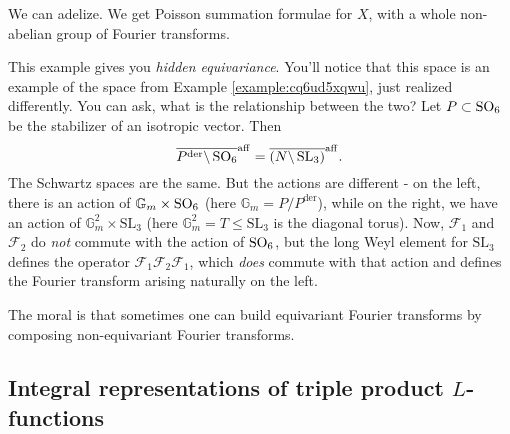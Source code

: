 \documentclass[reqno]{amsart} 
\numberwithin{theorem}{section}
\numberwithin{equation}{section}
\numberwithin{exercise}{section}
\begin{document}
\begin{example}
  We can adelize.  We get Poisson summation formulae for $X$, with a whole non-abelian group of Fourier transforms.

  This example gives you \emph{hidden equivariance}.  You'll notice that this space is an example of the space from Example \ref{example:cq6ud5xqwu}, just realized differently.  You can ask, what is the relationship between the two? Let $P \subset \operatorname{SO}_6$ be the stabilizer of an isotropic vector.  Then
  \begin{equation*}
    \overline{P^{\mathrm{der}} \backslash \operatorname{SO}_6}^{\mathrm{aff}} = \overline{(N \backslash \operatorname{SL}_3)}^{\mathrm{aff}}.
  \end{equation*}
  The Schwartz spaces are the same.  But the actions are different - on the left, there is an action of $\mathbb{G}_m \times \operatorname{SO}_6$ (here $\mathbb{G}_m = P / P^{\mathrm{der}}$), while on the right, we have an action of $\mathbb{G}_m^2 \times \mathrm{SL}_3$ (here $\mathbb{G}_m^2 = T \leq \mathrm{SL}_3$ is the diagonal torus).  Now, $\mathcal{F}_1$ and $\mathcal{F}_2$ do \emph{not} commute with the action of $\operatorname{SO}_6$, but the long Weyl element for $\mathrm{SL}_3$ defines the operator $\mathcal{F}_1 \mathcal{F}_2 \mathcal{F}_1$, which \emph{does} commute with that action and defines the Fourier transform arising naturally on the left.

  The moral is that sometimes one can build equivariant Fourier transforms by composing non-equivariant Fourier transforms.
\end{example}

\subsection{Integral representations of triple product $L$-functions}
\end{document}
